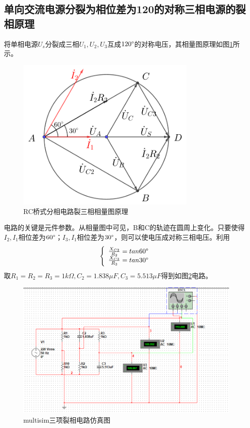 \documentclass[12pt]{article}%
\begin{document}
\subsection{单向交流电源分裂为相位差为120\degree 的对称三相电源的裂相原理}
将单相电源$U_s$分裂成三相$U_1,U_2,U_3$互成$120\degree$的对称电压，其相量图原理如图\ref{fig:2}所示。
\begin{figure}[htbp]
\centering\includegraphics[width=3.5in]{TIM20180531133124.png}
\caption{\heiti{}RC桥式分相电路裂三相相量图原理}\label{fig:2}
\end{figure}
电路的关键是元件参数。从相量图中可见，B和C的轨迹在圆周上变化。只要使得$I_2,I_1$相位差为$60\degree$；$I_3,I_1$相位差为$30\degree$，则可以使电压成对称三相电压。利用
\begin{equation}\label{}
\left\{ 
\begin{array}{c}
\frac{X_{C2}}{R_2}=tan60\degree \\
\frac{X_{C3}}{R_3}=tan30\degree
\end{array} \right.  
\end{equation}
取$R_1=R_2=R_3=1k\Omega,C_2=1.838\mu F,C_3=5.513\mu F$得到如图\ref{fig:3=}电路。
\begin{figure}[htbp]
\centering\includegraphics[width=\linewidth]{TIM20180531203831.png}
\caption{\heiti{}multisim三项裂相电路仿真图}\label{fig:3=}
\end{figure}
\end{document}
